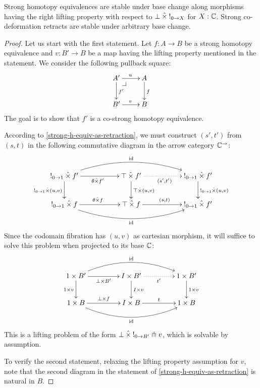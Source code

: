 \documentclass[reqno,10pt,a4paper,oneside]{amsart}
\begin{document}
\begin{lemma}
\label{strong-h-equiv-base-change-along-fibration}
Strong homotopy equivalences are stable under base change along morphisms having the right lifting property with respect to $\bot \mathbin{\hat{\times}} \mathord{!}_{0 \to X}$ for $X : \mathbb{C}$.
Strong co-deformation retracts are stable under arbitrary base change.
\end{lemma}

\begin{proof}
Let us start with the first statement.
Let $f : A \to B$ be a strong homotopy equivalence and $v : B' \to B$ be a map having the lifting property mentioned in the statement.
We consider the following pullback square:
\[
\xymatrix{
  A'
  \ar[r]^{u}
  \ar[d]^{f'}
  \pullback{dr}
&
  A
  \ar[d]^{f}
\\
  B'
  \ar[r]^{v}
&
  B
}
\]
The goal is to show that $f'$ is a co-strong homotopy equivalence.

According to \cref{strong-h-equiv-as-retraction}, we must construct $(s', t')$ from $(s, t)$ in the following commutative diagram in the arrow category $\mathbb{C}^{\to}$:
\[
\xymatrix@C+3em{
  \canonical_{0 \to 1} \hattimes f'
  \ar[r]_{\theta \hattimes f'}
  \ar[d]_{\canonical_{0 \to 1} \hattimes (u, v)}
  \ar@/^2em/[rr]^{\id}
&
  \top \hattimes f'
  \ar@{.>}[r]_{(s', t')}
  \ar[d]^{\top \hattimes (u, v)}
&
  \canonical_{0 \to 1} \hattimes f'
  \ar[d]^{\canonical_{0 \to 1} \hattimes (u, v)}
\\
  \canonical_{0 \to 1} \hattimes f
  \ar[r]^{\theta \hattimes f}
  \ar@/_2em/[rr]_{\id}
&
  \top \hattimes f
  \ar[r]^{(s, t)}
&
  \canonical_{0 \to 1} \hattimes f'
}
\]
Since the codomain fibration has $(u, v)$ as cartesian morphism, it will suffice to solve this problem when projected to its base $\mathbb{C}$:
\[
\xymatrix@C+2em{
  1 \times B'
  \ar[r]_{\bot \times B'}
  \ar[d]_{1 \times v}
  \ar@/^2em/[rr]^{\id}
&
  I \times B'
  \ar@{.>}[r]_{t'}
  \ar[d]^{I \times v}
&
  1 \times B'
  \ar[d]^{1 \times v}
\\
  1 \times B
  \ar[r]^{\bot \times f}
  \ar@/_2em/[rr]_{\id}
&
  I \times B
  \ar[r]^{t}
&
  1 \times B
}
\]
This is a lifting problem of the form $\bot \mathbin{\hat{\times}} \mathord{!}_{0 \to B'} \pitchfork v$, which is solvable by assumption.

To verify the second statement, relaxing the lifting property assumption for $v$, note that the second diagram in the statement of \cref{strong-h-equiv-as-retraction} is natural in $B$.
\end{proof}
\end{document}
